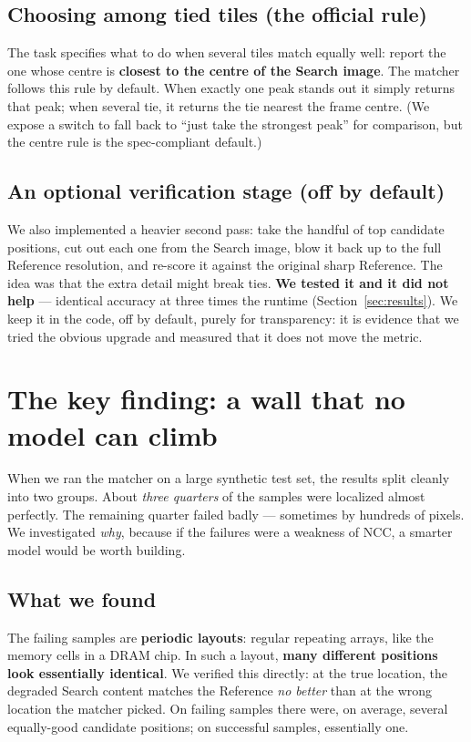 \documentclass[11pt]{article}
\newcommand{\term}[1]{\textbf{\color{klablue}#1}}
\begin{document}
\subsection{Choosing among tied tiles (the official rule)}
The task specifies what to do when several tiles match equally well: report the
one whose centre is \term{closest to the centre of the Search image}. The
matcher follows this rule by default. When exactly one peak stands out it simply
returns that peak; when several tie, it returns the tie nearest the frame
centre. (We expose a switch to fall back to ``just take the strongest peak'' for
comparison, but the centre rule is the spec-compliant default.)

\subsection{An optional verification stage (off by default)}
We also implemented a heavier second pass: take the handful of top candidate
positions, cut out each one from the Search image, blow it back up to the full
Reference resolution, and re-score it against the original sharp Reference.
The idea was that the extra detail might break ties. \term{We tested it and it
did not help} --- identical accuracy at three times the runtime
(Section~\ref{sec:results}). We keep it in the code, off by default, purely
for transparency: it is evidence that we tried the obvious upgrade and
measured that it does not move the metric.

\section{The key finding: a wall that no model can climb}
\label{sec:ceiling}

When we ran the matcher on a large synthetic test set, the results split
cleanly into two groups. About \emph{three quarters} of the samples were
localized almost perfectly. The remaining quarter failed badly --- sometimes
by hundreds of pixels. We investigated \emph{why}, because if the failures
were a weakness of NCC, a smarter model would be worth building.

\subsection{What we found}
The failing samples are \term{periodic layouts}: regular repeating arrays,
like the memory cells in a DRAM chip. In such a layout, \term{many different
positions look essentially identical}. We verified this directly: at the true
location, the degraded Search content matches the Reference \emph{no better}
than at the wrong location the matcher picked. On failing samples there were,
on average, several equally-good candidate positions; on successful samples,
essentially one.
\end{document}
